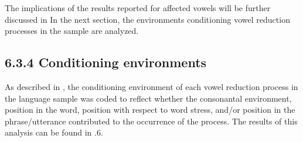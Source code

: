   The implications of the results reported for affected vowels will be further discussed in  In the next section, the environments conditioning vowel reduction processes in the sample are analyzed.


\subsection{6.3.4 Conditioning environments}

  As described in , the conditioning environment of each vowel reduction process in the language sample was coded to reflect whether the consonantal environment, position in the word, position with respect to word stress, and/or position in the phrase/utterance contributed to the occurrence of the process. The results of this analysis can be found in .6.






